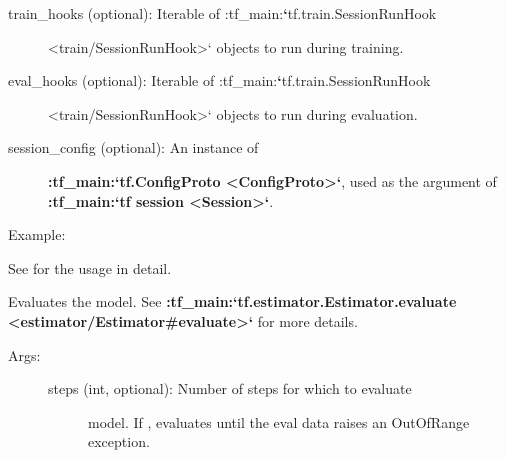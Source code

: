 \documentclass[letterpaper,10pt,english]{sphinxmanual}
\begin{document}
\begin{fulllineitems}
\begin{description}
\begin{description}
\item[{train\_hooks (optional): Iterable of :tf\_main:{\color{red}\bfseries{}{}`}tf.train.SessionRunHook}] \leavevmode
\textless{}train/SessionRunHook\textgreater{}{}` objects to run during training.

\item[{eval\_hooks (optional): Iterable of :tf\_main:{\color{red}\bfseries{}{}`}tf.train.SessionRunHook}] \leavevmode
\textless{}train/SessionRunHook\textgreater{}{}` objects to run during evaluation.

\item[{session\_config (optional): An instance of}] \leavevmode
{\color{red}\bfseries{}:tf\_main:{}`tf.ConfigProto \textless{}ConfigProto\textgreater{}{}`}, used as the 
argument of {\color{red}\bfseries{}:tf\_main:{}`tf session \textless{}Session\textgreater{}{}`}.

\end{description}

\end{description}

Example:
\begin{quote}

%
\begin{sphinxVerbatim}[commandchars=\\\{\}]
   
  
\end{sphinxVerbatim}
\end{quote}

See  for the usage in detail.

\begin{fulllineitems}
\label{\detokenize{code/run:shabda.run.Executor.evaluate}}
Evaluates the model. See {\color{red}\bfseries{}:tf\_main:{}`tf.estimator.Estimator.evaluate
\textless{}estimator/Estimator\#evaluate\textgreater{}{}`} for more details.
\begin{description}
\item[{Args:}] \leavevmode\begin{description}
\item[{steps (int, optional): Number of steps for which to evaluate}] \leavevmode
model. If , evaluates until the eval data raises an
OutOfRange exception.


\end{description}
\end{description}
\end{fulllineitems}
\end{fulllineitems}
\end{document}
